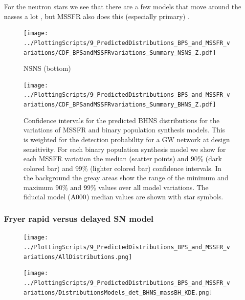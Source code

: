 \documentclass[twocolumn]{aastex63}
\newcommand\bhnsSingle{BHNS\xspace}
\newcommand{\mAzero}{\ensuremath{\rm{A}000}\xspace}
\begin{document}
For the neutron stars we see that there are a few models that move around the nasses a lot , but MSSFR also does this (especially primary) . 


%
\begin{figure}
    \centering
\texttt{[image: ../PlottingScripts/9\_PredictedDistributions\_BPS\_and\_MSSFR\_variations/CDF\_BPSandMSSFRvariations\_Summary\_NSNS\_Z.pdf]} 
\caption{ NSNS (bottom)}
    \label{fig:ConfidenceINtervals_NSNS}
\end{figure}
%



%
\begin{figure}
    \centering
%
\texttt{[image: ../PlottingScripts/9\_PredictedDistributions\_BPS\_and\_MSSFR\_variations/CDF\_BPSandMSSFRvariations\_Summary\_BHNS\_Z.pdf]} %
%
    \caption{Confidence intervals for the predicted \bhnsSingle distributions for the variations of MSSFR and binary population synthesis models. 
    This is weighted for the detection probability for a \ac{GW} network at design sensitivity. 
    For each binary population synthesis model we show for each \ac{MSSFR} variation the median (scatter points) and $90\%$ (dark colored bar) and $99\%$  (lighter colored bar) confidence intervals.  
    In the background the greay areas show the range of the minimum and maximum 90$\%$ and 99$\%$ values over all model variations.
     The fiducial model (\mAzero) median values are shown with star symbols.   }
    \label{fig:ConfidenceINtervals_BHNS}
\end{figure}
%


\subsubsection{Fryer rapid versus delayed SN model}




%
\begin{figure}
    \centering
\texttt{[image: ../PlottingScripts/9\_PredictedDistributions\_BPS\_and\_MSSFR\_variations/AllDistributions.png]} %
    \caption{}%
    \label{fig:CDFs_BHNS_observed}
\end{figure}
%





%
\begin{figure}
    \centering
\texttt{[image: ../PlottingScripts/9\_PredictedDistributions\_BPS\_and\_MSSFR\_variations/DistributionsModels\_det\_BHNS\_massBH\_KDE.png]} %
    \caption{}%
    \label{fig:CDFs_BHNS_observed_MBH}
\end{figure}
%
\end{document}
